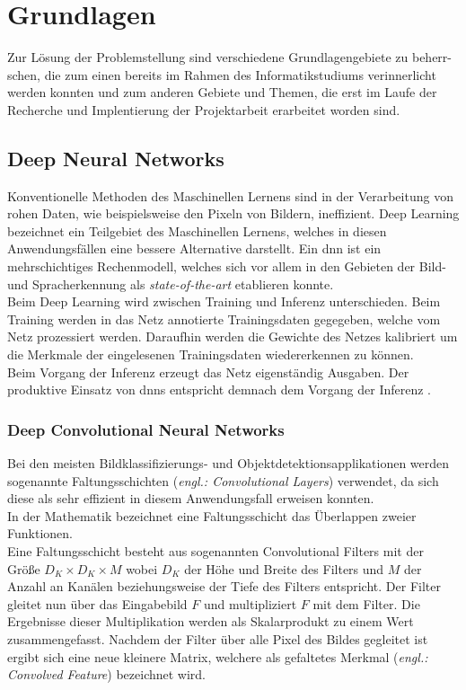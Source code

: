 \documentclass[oneside]{ausarbeitung}
\begin{document}
\chapter{Grundlagen}
\label{cha:grundlagen}
Zur Lösung der Problemstellung sind verschiedene Grundlagengebiete zu beherr-
schen, die zum einen bereits im Rahmen des Informatikstudiums verinnerlicht werden konnten und zum anderen Gebiete und Themen, die erst im Laufe der Recherche und Implentierung der Projektarbeit erarbeitet worden sind.
\section{Deep Neural Networks}
Konventionelle Methoden des Maschinellen Lernens sind in der Verarbeitung von rohen Daten, wie beispielsweise den Pixeln von Bildern, ineffizient.
Deep Learning bezeichnet ein Teilgebiet des Maschinellen Lernens, welches in diesen Anwendungsfällen eine bessere Alternative darstellt. Ein \ac{dnn} ist ein mehrschichtiges Rechenmodell, welches sich vor allem in den Gebieten der Bild- und Spracherkennung als \textit{state-of-the-art} etablieren konnte.\\
Beim Deep Learning wird zwischen Training und Inferenz unterschieden. Beim Training werden in das Netz annotierte Trainingsdaten gegegeben, welche vom Netz prozessiert werden. Daraufhin werden die Gewichte des Netzes kalibriert um die Merkmale der eingelesenen Trainingsdaten wiedererkennen zu können.\\
Beim Vorgang der Inferenz erzeugt das Netz eigenständig Ausgaben. Der produktive Einsatz von \acp{dnn} entspricht demnach dem Vorgang der Inferenz \cite{deepl-vs-traditional, deepl-lecun}. 
\subsection{Deep Convolutional Neural Networks}
Bei den meisten Bildklassifizierungs- und Objektdetektionsapplikationen werden sogenannte Faltungsschichten (\textit{engl.: Convolutional Layers}) verwendet, da sich diese als sehr effizient in diesem Anwendungsfall erweisen konnten.\\
In der Mathematik bezeichnet eine Faltungsschicht das Überlappen zweier Funktionen.\\
Eine Faltungsschicht besteht aus sogenannten Convolutional Filters mit der Größe $D_K \times D_K \times M$ wobei $D_K$ der Höhe und Breite des Filters und $M$ der Anzahl an Kanälen beziehungsweise der Tiefe des Filters entspricht. Der Filter gleitet nun über das Eingabebild $F$ und multipliziert $F$ mit dem Filter. Die Ergebnisse dieser Multiplikation werden als Skalarprodukt zu einem Wert zusammengefasst. Nachdem der Filter über alle Pixel des Bildes gegleitet ist ergibt sich eine neue kleinere Matrix, welchere als gefaltetes Merkmal (\textit{engl.: Convolved Feature}) bezeichnet wird.
\end{document}
